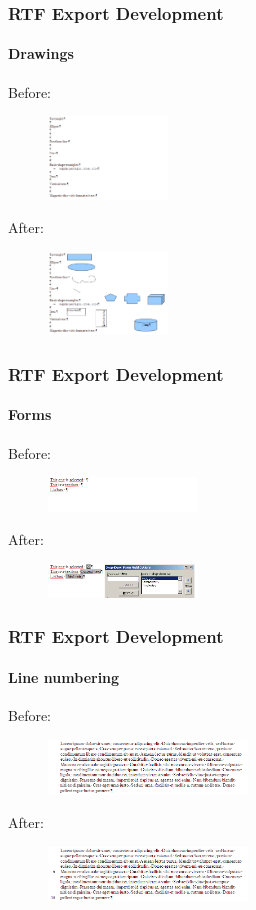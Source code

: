 \documentclass[hyperref={pdfpagelabels=false}]{beamer}
\begin{document}
\begin{frame}
\frametitle{RTF Export Development}
\framesubtitle{Drawings}
Before:
\begin{figure}[H]
\includegraphics[width=120px,keepaspectratio]{pic/draw-old.png}
\end{figure}
After:
\begin{figure}[H]
\includegraphics[width=120px,keepaspectratio]{pic/draw-new.png}
\end{figure}
\end{frame}

\begin{frame}
\frametitle{RTF Export Development}
\framesubtitle{Forms}
Before:
\begin{figure}[H]
\includegraphics[width=150px,keepaspectratio]{pic/forms-old.png}
\end{figure}
After:
\begin{figure}[H]
\includegraphics[width=150px,keepaspectratio]{pic/forms-new.png}
\end{figure}
\end{frame}

\begin{frame}
\frametitle{RTF Export Development}
\framesubtitle{Line numbering}
Before:
\begin{figure}[H]
\includegraphics[width=200px,keepaspectratio]{pic/linenum-old.png}
\end{figure}
After:
\begin{figure}[H]
\includegraphics[width=200px,keepaspectratio]{pic/linenum-new.png}
\end{figure}
\end{frame}
\end{document}
